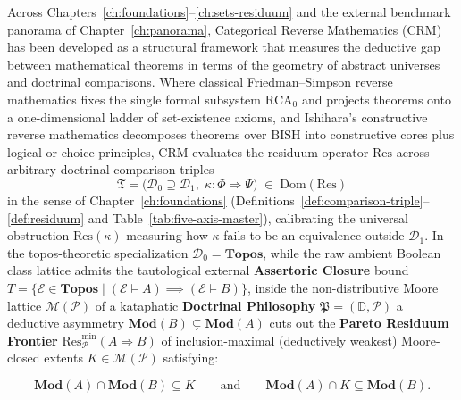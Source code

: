 Across Chapters~\ref{ch:foundations}--\ref{ch:sets-residuum} and the external benchmark panorama of Chapter~\ref{ch:panorama}, Categorical Reverse Mathematics ($\mathrm{CRM}$) has been developed as a structural framework that measures the deductive gap between mathematical theorems in terms of the geometry of abstract universes and doctrinal comparisons. Where classical Friedman--Simpson reverse mathematics fixes the single formal subsystem $\mathrm{RCA}_0$ and projects theorems onto a one-dimensional ladder of set-existence axioms, and Ishihara's constructive reverse mathematics decomposes theorems over $\mathrm{BISH}$ into constructive cores plus logical or choice principles, $\mathrm{CRM}$ evaluates the residuum operator $\mathrm{Res}$ across arbitrary doctrinal comparison triples
\[
  \mathfrak{T} = \bigl(\mathcal{D}_0 \supseteq \mathcal{D}_1,\; \kappa : \Phi \Longrightarrow \Psi\bigr) \;\in\; \mathrm{Dom}(\mathrm{Res})
\]
in the sense of Chapter~\ref{ch:foundations} (Definitions~\ref{def:comparison-triple}--\ref{def:residuum} and Table~\ref{tab:five-axis-master}), calibrating the universal obstruction $\mathrm{Res}(\kappa)$ measuring how $\kappa$ fails to be an equivalence outside $\mathcal{D}_1$. In the topos-theoretic specialization $\mathcal{D}_0 = \mathbf{Topos}$, while the raw ambient Boolean class lattice admits the tautological external \textbf{Assertoric Closure} bound $T = \{\mathcal{E} \in \mathbf{Topos} \mid (\mathcal{E} \models A) \implies (\mathcal{E} \models B)\}$, inside the non-distributive Moore lattice $\mathcal{M}(\mathcal{P})$ of a kataphatic \textbf{Doctrinal Philosophy} $\mathfrak{P} = (\mathbb{D}, \mathcal{P})$ a deductive asymmetry $\mathbf{Mod}(B) \subsetneq \mathbf{Mod}(A)$ cuts out the \textbf{Pareto Residuum Frontier} $\mathrm{Res}_{\mathcal{P}}^{\min}(A \Rightarrow B)$ of inclusion-maximal (deductively weakest) Moore-closed extents $K \in \mathcal{M}(\mathcal{P})$ satisfying:

\[
  \mathbf{Mod}(A) \cap \mathbf{Mod}(B) \subseteq K \qquad\text{and}\qquad \mathbf{Mod}(A) \cap K \subseteq \mathbf{Mod}(B).
\]

